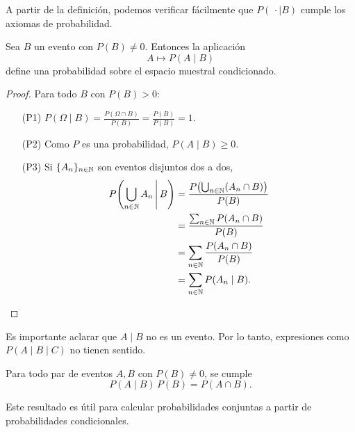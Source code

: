 A partir de la definición, podemos verificar fácilmente que $P(\,\cdot \mid B)$ cumple los axiomas de probabilidad.

\begin{proposition}
    Sea $B$ un evento con $P(B) \neq 0$. Entonces la aplicación
    \begin{equation*}
        A \mapsto P(A \mid B)
    \end{equation*}
    define una probabilidad sobre el espacio muestral condicionado.
\end{proposition}

\begin{proof}
    Para todo $B$ con $P(B)>0$:
    \begin{itemize}
        \item[(P1)] $P(\Omega \mid B) = \frac{P(\Omega \cap B)}{P(B)} = \frac{P(B)}{P(B)}=1$.
        \item[(P2)] Como $P$ es una probabilidad, $P(A \mid B) \geq 0$.
        \item[(P3)] Si $\{A_n\}_{n \in \mathbb{N}}$ son eventos disjuntos dos a dos,
        \begin{align*}
            P\!\left(\bigcup_{n \in \mathbb{N}} A_n \,\middle|\, B\right)
            &= \frac{P\!\left(\bigcup_{n \in \mathbb{N}}(A_n \cap B)\right)}{P(B)} \\
            &= \frac{\sum_{n \in \mathbb{N}} P(A_n \cap B)}{P(B)} \\
            &= \sum_{n \in \mathbb{N}} \frac{P(A_n \cap B)}{P(B)} \\
            &= \sum_{n \in \mathbb{N}} P(A_n \mid B).
        \end{align*}
    \end{itemize}
\end{proof}

\begin{remark}
    Es importante aclarar que $A \mid B$ no es un evento. Por lo tanto, expresiones como $P(A \mid B \mid C)$ no tienen sentido.
\end{remark}

\begin{proposition}
    Para todo par de eventos $A, B$ con $P(B) \neq 0$, se cumple
    \begin{equation*}
        P(A \mid B) \, P(B) = P(A \cap B).
    \end{equation*}
\end{proposition}

Este resultado es útil para calcular probabilidades conjuntas a partir de probabilidades condicionales.

